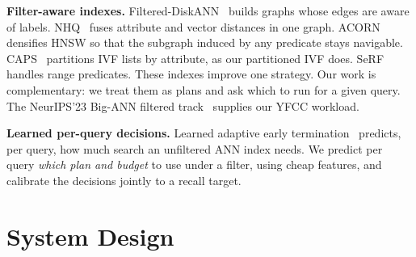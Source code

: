 \documentclass[sigconf,nonacm]{acmart}
\begin{document}
\textbf{Filter-aware indexes.} Filtered-DiskANN~\cite{gollapudi2023filtereddiskann} builds graphs whose edges are aware of labels. NHQ~\cite{wang2023nhq} fuses attribute and vector distances in one graph. ACORN~\cite{patel2024acorn} densifies HNSW so that the subgraph induced by any predicate stays navigable. CAPS~\cite{gupta2023caps} partitions IVF lists by attribute, as our partitioned IVF does. SeRF~\cite{zuo2024serf} handles range predicates. These indexes improve one strategy. Our work is complementary: we treat them as plans and ask which to run for a given query. The NeurIPS'23 Big-ANN filtered track~\cite{simhadri2024neurips23} supplies our YFCC workload.

\textbf{Learned per-query decisions.} Learned adaptive early termination~\cite{li2020learned} predicts, per query, how much search an unfiltered ANN index needs. We predict per query \emph{which plan and budget} to use under a filter, using cheap features, and calibrate the decisions jointly to a recall target.

\section{System Design}\label{sec:design}
\end{document}

